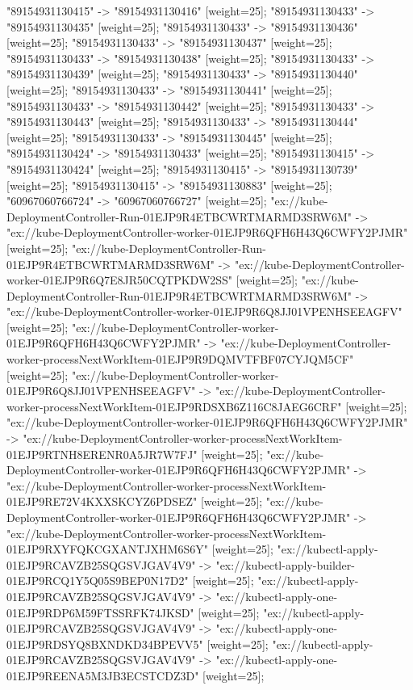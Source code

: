 {"89154931130415" -> "89154931130416" [weight=25];
"89154931130433" -> "89154931130435" [weight=25];
"89154931130433" -> "89154931130436" [weight=25];
"89154931130433" -> "89154931130437" [weight=25];
"89154931130433" -> "89154931130438" [weight=25];
"89154931130433" -> "89154931130439" [weight=25];
"89154931130433" -> "89154931130440" [weight=25];
"89154931130433" -> "89154931130441" [weight=25];
"89154931130433" -> "89154931130442" [weight=25];
"89154931130433" -> "89154931130443" [weight=25];
"89154931130433" -> "89154931130444" [weight=25];
"89154931130433" -> "89154931130445" [weight=25];
"89154931130424" -> "89154931130433" [weight=25];
"89154931130415" -> "89154931130424" [weight=25];
"89154931130415" -> "89154931130739" [weight=25];
"89154931130415" -> "89154931130883" [weight=25];
"60967060766724" -> "60967060766727" [weight=25];
"ex://kube-DeploymentController-Run-01EJP9R4ETBCWRTMARMD3SRW6M" -> "ex://kube-DeploymentController-worker-01EJP9R6QFH6H43Q6CWFY2PJMR" [weight=25];
"ex://kube-DeploymentController-Run-01EJP9R4ETBCWRTMARMD3SRW6M" -> "ex://kube-DeploymentController-worker-01EJP9R6Q7E8JR50CQTPKDW2SS" [weight=25];
"ex://kube-DeploymentController-Run-01EJP9R4ETBCWRTMARMD3SRW6M" -> "ex://kube-DeploymentController-worker-01EJP9R6Q8JJ01VPENHSEEAGFV" [weight=25];
"ex://kube-DeploymentController-worker-01EJP9R6QFH6H43Q6CWFY2PJMR" -> "ex://kube-DeploymentController-worker-processNextWorkItem-01EJP9R9DQMVTFBF07CYJQM5CF" [weight=25];
"ex://kube-DeploymentController-worker-01EJP9R6Q8JJ01VPENHSEEAGFV" -> "ex://kube-DeploymentController-worker-processNextWorkItem-01EJP9RDSXB6Z116C8JAEG6CRF" [weight=25];
"ex://kube-DeploymentController-worker-01EJP9R6QFH6H43Q6CWFY2PJMR" -> "ex://kube-DeploymentController-worker-processNextWorkItem-01EJP9RTNH8ERENR0A5JR7W7FJ" [weight=25];
"ex://kube-DeploymentController-worker-01EJP9R6QFH6H43Q6CWFY2PJMR" -> "ex://kube-DeploymentController-worker-processNextWorkItem-01EJP9RE72V4KXXSKCYZ6PDSEZ" [weight=25];
"ex://kube-DeploymentController-worker-01EJP9R6QFH6H43Q6CWFY2PJMR" -> "ex://kube-DeploymentController-worker-processNextWorkItem-01EJP9RXYFQKCGXANTJXHM6S6Y" [weight=25];
"ex://kubectl-apply-01EJP9RCAVZB25SQGSVJGAV4V9" -> "ex://kubectl-apply-builder-01EJP9RCQ1Y5Q05S9BEP0N17D2" [weight=25];
"ex://kubectl-apply-01EJP9RCAVZB25SQGSVJGAV4V9" -> "ex://kubectl-apply-one-01EJP9RDP6M59FTSSRFK74JKSD" [weight=25];
"ex://kubectl-apply-01EJP9RCAVZB25SQGSVJGAV4V9" -> "ex://kubectl-apply-one-01EJP9RDSYQ8BXNDKD34BPEVV5" [weight=25];
"ex://kubectl-apply-01EJP9RCAVZB25SQGSVJGAV4V9" -> "ex://kubectl-apply-one-01EJP9REENA5M3JB3ECSTCDZ3D" [weight=25];
}
